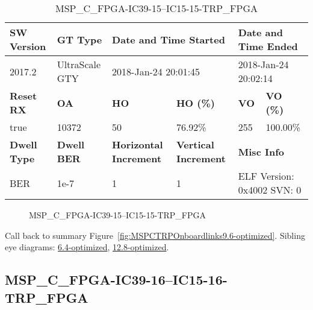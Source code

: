 \begin{table}[h]
\centering
\caption{MSP\_C\_FPGA-IC39-15--IC15-15-TRP\_FPGA}
\label{tab:MSPCFPGAIC3915IC1515TRPFPGA9.6-optimized}
\begin{tabular}{@{}|l|l|l|l|l|l|@{}}
\toprule
\textbf{SW Version}                & \textbf{GT Type}   & \multicolumn{2}{l|}{\textbf{Date and Time Started}}            & \multicolumn{2}{l|}{\textbf{Date and Time Ended}}        \\ \midrule
2017.2                       & UltraScale GTY          & \multicolumn{2}{l|}{2018-Jan-24 20:01:45}                   & \multicolumn{2}{l|}{2018-Jan-24 20:02:14}               \\ \midrule
\textbf{Reset RX}                  & \textbf{OA} & \textbf{HO}   & \textbf{HO (\%)} & \textbf{VO} & \textbf{VO (\%)} \\ \midrule
true & 10372        & 50          & 76.92\%        & 255        & 100.00\%       \\ \midrule
\textbf{Dwell Type}                & \textbf{Dwell BER} & \textbf{Horizontal Increment} & \textbf{Vertical Increment}    & \multicolumn{2}{l|}{\textbf{Misc Info}}                  \\ \midrule
BER                            & 1e-7        & 1        & 1           & \multicolumn{2}{l|}{ELF Version: 0x4002 SVN: 0}                         \\ \bottomrule
\end{tabular}
\end{table}

\begin{figure}[h]
\caption{MSP\_C\_FPGA-IC39-15--IC15-15-TRP\_FPGA} \label{fig:MSPCFPGAIC3915IC1515TRPFPGA9.6-optimized}
\end{figure}

Call back to summary Figure~\ref{fig:MSPCTRPOnboardlinks9.6-optimized}.
Sibling eye diagrams: \hyperref[sec:MSPCFPGAIC3915IC1515TRPFPGA6.4-optimized]{6.4-optimized}, \hyperref[sec:MSPCFPGAIC3915IC1515TRPFPGA12.8-optimized]{12.8-optimized}.

\clearpage
\newpage


\subsection{MSP\_C\_FPGA-IC39-16--IC15-16-TRP\_FPGA}\label{sec:MSPCFPGAIC3916IC1516TRPFPGA9.6-optimized}


